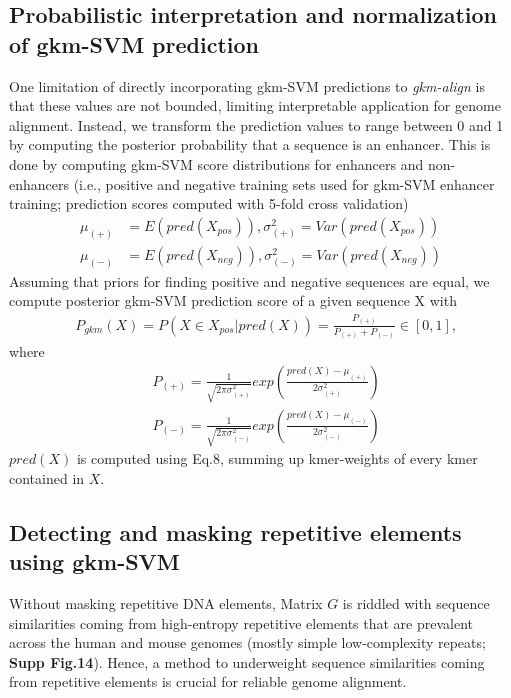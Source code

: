 \documentclass[english]{article}
\begin{document}
  \subsection{Probabilistic interpretation and normalization of gkm-SVM prediction}
 One limitation of directly incorporating gkm-SVM predictions to \textit{gkm-align} is that these values are not bounded, limiting interpretable application for genome alignment. Instead, we transform the prediction values to range between 0 and 1 by computing the posterior probability that a sequence is an enhancer. This is done by computing gkm-SVM score distributions for enhancers and non-enhancers (i.e., positive and negative training sets used for gkm-SVM enhancer training; prediction scores computed with 5-fold cross validation)
 \begin{align*}
     \mu_{(+)} &= E(pred(X_{pos})), \sigma^2_{(+)} = Var(pred(X_{pos}))\\
     \mu_{(-)} &= E(pred(X_{neg})), \sigma^2_{(-)} = Var(pred(X_{neg}))
 \end{align*}
Assuming that priors for finding positive and negative sequences are equal, we compute posterior gkm-SVM prediction score of a given sequence X with
 \begin{align*}
     &P_{gkm}(X) = P(X\in X_{pos}|pred(X))= \frac{P_{(+)}}{P_{(+)} + P_{(-)}} \in [0,1], \tag{Eq.11} 
\end{align*}
where
\begin{align*}
     &P_{(+)} = \frac{1}{\sqrt{2\pi \sigma_{(+)}^2}}exp(\frac{pred(X)-\mu_{(+)}}{2\sigma_{(+)}^2})\\ 
     &P_{(-)} = \frac{1}{\sqrt{2\pi \sigma_{(-)}^2}}exp(\frac{pred(X)-\mu_{(-)}}{2\sigma_{(-)}^2})
 \end{align*}
$pred(X)$ is computed using Eq.8, summing up kmer-weights of every kmer contained in $X$.





 
\subsection{Detecting and masking repetitive elements using gkm-SVM}

Without masking repetitive DNA elements, Matrix  $G$ is riddled with sequence similarities coming from high-entropy repetitive elements that are prevalent across the human and mouse genomes (mostly simple low-complexity repeats; \textbf{Supp Fig.14}). Hence, a method to underweight sequence similarities coming from repetitive elements is crucial for reliable genome alignment. 
\end{document}
